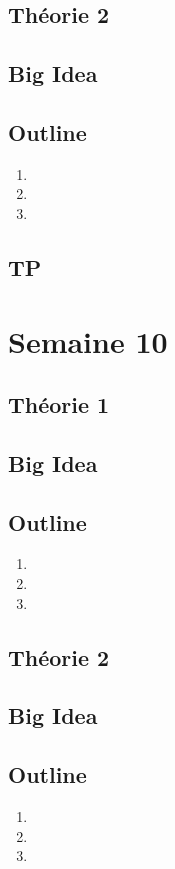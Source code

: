 \documentclass{article}
\begin{document}
\subsection{Théorie 2}
\subsection*{Big Idea}
\subsection*{Outline}
\begin{enumerate}
    \item
    \item
    \item
\end{enumerate}
\subsection{TP}

\pagebreak
\section{Semaine 10}
\subsection{Théorie 1}
\subsection*{Big Idea}
\subsection*{Outline}
\begin{enumerate}
    \item
    \item
    \item
\end{enumerate}
\subsection{Théorie 2}
\subsection*{Big Idea}
\subsection*{Outline}
\begin{enumerate}
    \item
    \item
    \item
\end{enumerate}
\end{document}
